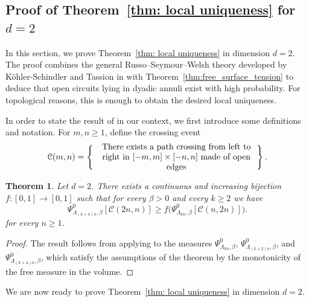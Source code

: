 \documentclass[11pt,a4paper]{article}
\newtheorem{theorem}{Theorem}[section]
\theoremstyle{definition}
\numberwithin{equation}{section}
\begin{document}
\subsection{Proof of Theorem~\ref{thm: local uniqueness} for $d=2$}\label{sec:uniq_d=2}

In this section, we prove Theorem~\ref{thm: local uniqueness} in dimension $d=2$. The proof combines the general Russo--Seymour--Welsh theory developed by Köhler-Schindler and Tassion in \cite{KohlerTassionGeneralRSW} with Theorem~\ref{thm:free_surface_tension} to deduce that open circuits lying in dyadic annuli exist with high probability. For topological reasons, this is enough to obtain the desired local uniqueness. 

In order to state the result of \cite{KohlerTassionGeneralRSW} in our context, we first introduce some definitions and notation. For $m,n\geq 1$, define the crossing event 
\begin{equation}
      \mathcal{C}(m,n)=\left\{\text{
        \begin{minipage}{.55\linewidth}\centering
          There exists a path crossing from left to right in $[-m,m]\times[-n,n]$ made of open edges 
        \end{minipage}}\right\}.
\end{equation}

\begin{theorem}\label{thm: RSW}
Let $d=2$. There exists a continuous and increasing bijection $f:[0,1]\rightarrow [0,1]$ such that for every $\beta>0$ and every $k\geq 2$ we have 
\begin{equation}
\Psi^0_{\Lambda_{(k+4)n},\beta}[\mathcal{C}(2 n,n)] \geq f \big(\Psi^0_{\Lambda_{kn},\beta}[\mathcal{C}(n,2n)] \big).
\end{equation}
for every $n\geq 1$.
\end{theorem}
\begin{proof}
The result follows from applying \cite[Theorem~2]{KohlerTassionGeneralRSW} to the measures $\Psi^0_{\Lambda_{kn},\beta}$, $\Psi^0_{\Lambda_{(k+2)n},\beta}$, and $\Psi^0_{\Lambda_{(k+4)n},\beta}$, which satisfy the assumptions of the theorem by the monotonicity of the free measure in the volume.   
\end{proof}

We are now ready to prove Theorem~\ref{thm: local uniqueness} in dimension $d=2$.
\end{document}
